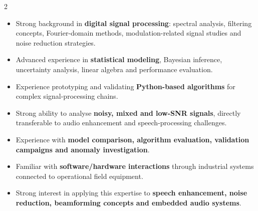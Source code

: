 \documentclass[8pt,a4paper,ragged2e,withhyper]{altacv}
\begin{document}
\begin{paracol}{2}

\begin{itemize}
  \item Strong background in \textbf{digital signal processing}: spectral analysis, filtering concepts, Fourier-domain methods, modulation-related signal studies and noise reduction strategies.
  \item Advanced experience in \textbf{statistical modeling}, Bayesian inference, uncertainty analysis, linear algebra and performance evaluation.
  \item Experience prototyping and validating \textbf{Python-based algorithms} for complex signal-processing chains.
  \item Strong ability to analyse \textbf{noisy, mixed and low-SNR signals}, directly transferable to audio enhancement and speech-processing challenges.
  \item Experience with \textbf{model comparison, algorithm evaluation, validation campaigns and anomaly investigation}.
  \item Familiar with \textbf{software/hardware interactions} through industrial systems connected to operational field equipment.
  \item Strong interest in applying this expertise to \textbf{speech enhancement, noise reduction, beamforming concepts and embedded audio systems}.
\end{itemize}


\divider

\divider

\medskip


\divider

\divider

\divider





\end{paracol}
\end{document}
